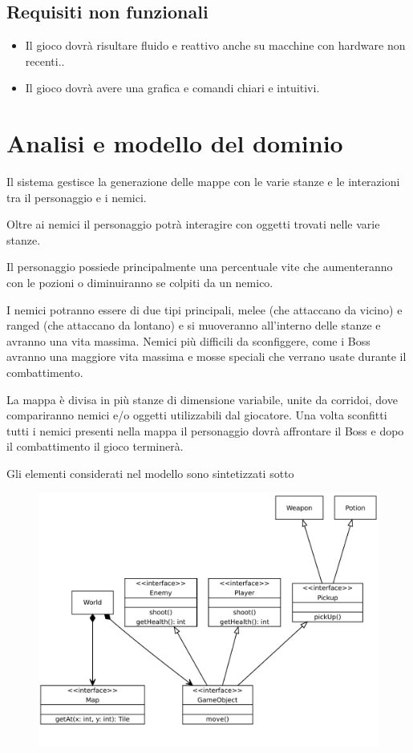 \documentclass[a4paper,12pt]{report}
\begin{document}
    \subsection{Requisiti non funzionali}
    \begin{itemize}
        \item Il gioco dovrà risultare fluido e reattivo anche su macchine con hardware non recenti..
        \item Il gioco dovrà avere una grafica e comandi chiari e intuitivi.
    \end{itemize}
    \section{Analisi e modello del dominio}
    \par Il sistema gestisce la generazione delle mappe con le varie stanze e le interazioni tra il
    personaggio e i nemici.
    \par Oltre ai nemici il personaggio potrà interagire con oggetti trovati nelle varie stanze.
    \par Il personaggio possiede principalmente una percentuale vite che aumenteranno con le pozioni
    o diminuiranno se colpiti da un nemico.
    \par I nemici potranno essere di due tipi principali, melee (che attaccano da vicino) e ranged (che attaccano da lontano)
    e si muoveranno all'interno delle stanze e avranno una vita massima. Nemici più difficili da sconfiggere,
    come i Boss avranno una maggiore vita massima e mosse speciali che verrano usate durante il combattimento.
    \par La mappa è divisa in più stanze di dimensione variabile, unite da corridoi, dove compariranno nemici
    e/o oggetti utilizzabili dal giocatore.
    Una volta sconfitti tutti i nemici presenti nella mappa il personaggio dovrà affrontare il Boss e dopo il
    combattimento il gioco terminerà.
    \par \par Gli elementi considerati nel modello sono sintetizzati sotto
    \begin{figure}
        \includegraphics[width=\linewidth]{uml1}
    \end{figure}
\end{document}
